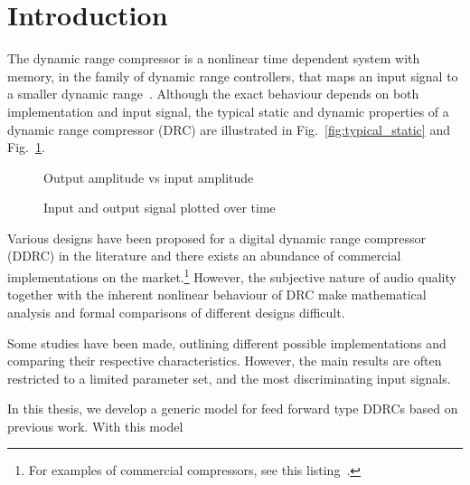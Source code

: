 \documentclass[../main2.tex]{subfiles}
\providecommand{\rootdir}{..}
\begin{document}
\section{Introduction}
The dynamic range compressor is a nonlinear time dependent system with memory, in the family of dynamic range controllers, that maps an input signal to a smaller dynamic range~\cite{dafx11}. Although the exact behaviour depends on both implementation and input signal, the typical static and dynamic properties of a dynamic range compressor (DRC) are illustrated in Fig.~\ref{fig:typical_static} and Fig.~\ref{fig:typical_envelope}.

\begin{figure}[ht]
\captionsetup{justification=centering}

\begin{minipage}[t]{.5\textwidth}
 \centering

\caption{Output amplitude vs input amplitude} 
\label{fig:typical_static}
\end{minipage}%
\begin{minipage}[t]{.5\textwidth}
\centering

\caption{Input and output signal plotted over time} 
\label{fig:typical_envelope}
\end{minipage}
\end{figure}

Various designs have been proposed for a digital dynamic range compressor (DDRC) in the literature and there exists an abundance of commercial implementations on the market.\footnote{For examples of commercial compressors, see this listing~\cite{commercial}.} However, the subjective nature of audio quality together with the inherent nonlinear behaviour of DRC make mathematical analysis and formal comparisons of different designs difficult.

Some studies have been made, outlining different possible implementations and comparing their respective characteristics. However, the main results are often restricted to a limited parameter set, and the most discriminating input signals.

In this thesis, we develop a generic model for feed forward type DDRCs based on previous work.  With this model
\end{document}
